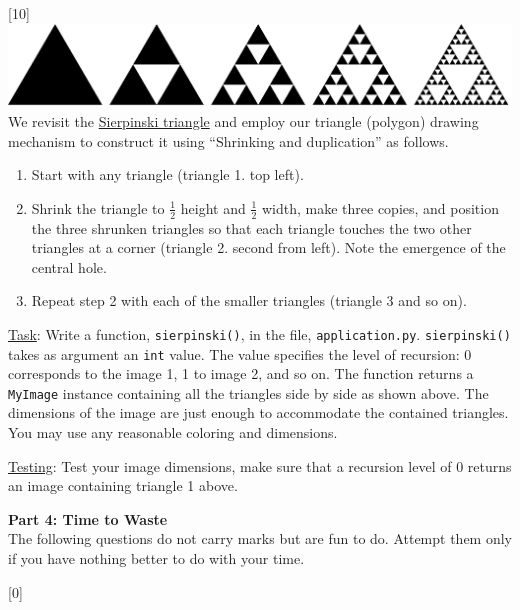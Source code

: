\documentclass[addpoints]{exam}
\begin{document}
\begin{questions}
[10]
  \includegraphics[width=\linewidth]{sierpinski2}\\
  We revisit the \href{https://en.wikipedia.org/wiki/Sierpinski_triangle}{Sierpinski triangle} and employ our triangle (polygon) drawing mechanism to construct it using ``Shrinking and duplication'' as follows.
  \begin{enumerate}
  \item Start with any triangle (triangle 1. top left).
  \item Shrink the triangle to $\frac{1}{2}$ height and $\frac{1}{2}$ width, make three copies, and position the three shrunken triangles so that each triangle touches the two other triangles at a corner (triangle 2. second from left). Note the emergence of the central hole.
  \item Repeat step 2 with each of the smaller triangles (triangle 3 and so on).
  \end{enumerate}

  \underline{Task}: Write a function, \texttt{sierpinski()}, in the file, \texttt{application.py}. \texttt{sierpinski()} takes as argument an \texttt{int} value. The value specifies the level of recursion: 0 corresponds to the image 1, 1 to image 2, and so on. The function returns a \texttt{MyImage} instance containing all the triangles side by side as shown above. The dimensions of the image are just enough to accommodate the contained triangles. You may use any reasonable coloring and dimensions.

  \underline{Testing}: Test your image dimensions, make sure that a recursion level of 0 returns an image containing triangle 1 above.
  
  \begin{EnvFullwidth}
    {\Large\bf Part 4: Time to Waste}\\
    The following questions do not carry marks but are fun to do. Attempt them only if you have nothing better to do with your time.
  \end{EnvFullwidth}


[0]
  \label{q:interpolate}


\end{questions}
\end{document}
